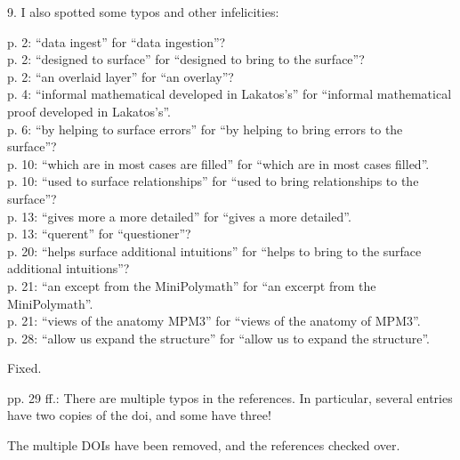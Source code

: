 \begin{mdframed}[backgroundcolor=orange!10]
9. I also spotted some typos and other infelicities:

p. 2: ``data ingest'' for ``data ingestion''?\\
p. 2: ``designed to surface'' for ``designed to bring to the surface''?\\
p. 2: ``an overlaid layer'' for ``an overlay''?\\
p. 4: ``informal mathematical developed in Lakatos's'' for ``informal mathematical proof developed in Lakatos's''.\\
p. 6: ``by helping to surface errors'' for ``by helping to bring errors to the surface''?\\
p. 10: ``which are in most cases are filled'' for ``which are in most cases filled''.\\
p. 10: ``used to surface relationships'' for ``used to bring relationships to the surface''?\\
p. 13: ``gives more a more detailed'' for ``gives a more detailed''.\\
p. 13: ``querent'' for ``questioner''?\\
p. 20: ``helps surface additional intuitions'' for ``helps to bring to the surface additional intuitions''?\\
p. 21: ``an except from the MiniPolymath'' for ``an excerpt from the MiniPolymath''.\\
p. 21: ``views of the anatomy MPM3'' for ``views of the anatomy of MPM3''.\\
p. 28: ``allow us expand the structure'' for ``allow us to expand the structure''.\\
\end{mdframed}

Fixed.

\begin{mdframed}[backgroundcolor=orange!10]
pp. 29 ff.: There are multiple typos in the references. In particular, several entries have two copies of the doi, and some have three!
\end{mdframed}

The multiple DOIs have been removed, and the references checked over.
